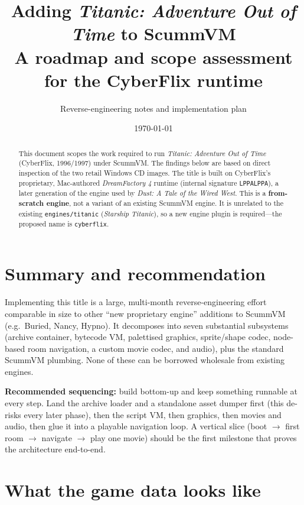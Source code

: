\documentclass[11pt]{article}
\title{\textbf{Adding \emph{Titanic: Adventure Out of Time} to ScummVM}\\[2pt]
\large A roadmap and scope assessment for the CyberFlix runtime}
\author{Reverse-engineering notes and implementation plan}
\date{\today}
\newcommand{\code}[1]{\texttt{#1}}
\begin{document}
\maketitle

\begin{abstract}
\noindent This document scopes the work required to run \emph{Titanic: Adventure
Out of Time} (CyberFlix, 1996/1997) under ScummVM. The findings below are based
on direct inspection of the two retail Windows CD images. The title is built on
CyberFlix's proprietary, Mac-authored \emph{DreamFactory 4} runtime (internal
signature \code{LPPALPPA}), a later generation of the engine used by \emph{Dust:
A Tale of the Wired West}. This is a
\textbf{from-scratch engine}, not a variant of an existing ScummVM engine. It is
unrelated to the existing \code{engines/titanic} (\emph{Starship Titanic}), so a
new engine plugin is required---the proposed name is \code{cyberflix}.\end{abstract}

\section{Summary and recommendation}

Implementing this title is a large, multi-month reverse-engineering effort
comparable in size to other ``new proprietary engine'' additions to ScummVM
(e.g.\ Buried, Nancy, Hypno). It decomposes into seven substantial subsystems
(archive container, bytecode VM, palettised graphics, sprite/shape codec,
node-based room navigation, a custom movie codec, and audio), plus the standard
ScummVM plumbing. None of these can be borrowed wholesale from existing engines.

\textbf{Recommended sequencing:} build bottom-up and keep something runnable at
every step. Land the archive loader and a standalone asset dumper first (this
de-risks every later phase), then the script VM, then graphics, then movies and
audio, then glue it into a playable navigation loop. A vertical slice (boot
$\rightarrow$ first room $\rightarrow$ navigate $\rightarrow$ play one movie)
should be the first milestone that proves the architecture end-to-end.

\section{What the game data looks like}
\end{document}
